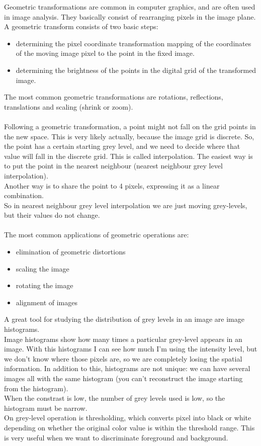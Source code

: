 Geometric transformations are common in computer graphics, and are often used in image analysis. They basically consist of rearranging pixels in the image plane. \\
A geometric transform consists of two basic steps:
\begin{itemize}
	\item determining the pixel coordinate transformation mapping of the coordinates of the moving image pixel to the point in the fixed image.
	\item determining the brightness of the points in the digital grid of the transformed image.
\end{itemize}
The most common geometric transformations are rotations, reflections, translations and scaling (shrink or zoom). \\ \\ 
Following a geometric transformation, a point might not fall on the grid points in the new space. This is very likely actually, because the image grid is discrete. So, the point has a certain starting grey level, and we need to decide where that value will fall in the discrete grid. This is called interpolation. The easiest way is to put the point in the nearest neighbour (nearest neighbour grey level interpolation). \\
Another way is to share the point to 4 pixels, expressing it as a linear combination. \\
So in nearest neighbour grey level interpolation we are just moving grey-levels, but their values do not change. \\ \\
The most common applications of geometric operations are:
\begin{itemize}
	\item elimination of geometric distortions 
	\item scaling the image 
	\item rotating the image
	\item alignment of images
\end{itemize}

A great tool for studying the distribution of grey levels in an image are image histograms. \\
Image histograms show how many times a particular grey-level appears in an image. With this histograms I can see how much I'm using the intensity level, but we don't know where those pixels are, so we are completely losing the spatial information. In addition to this, histograms are not unique: we can have several images all with the same histogram (you can't reconstruct the image starting from the histogram). \\
When the constrast is low, the number of grey levels used is low, so the histogram must be narrow. \\ 
On grey-level operation is thresholding, which converts pixel into black or white depending on whether the original color value is within the threshold range. This is very useful when we want to discriminate foreground and background.



